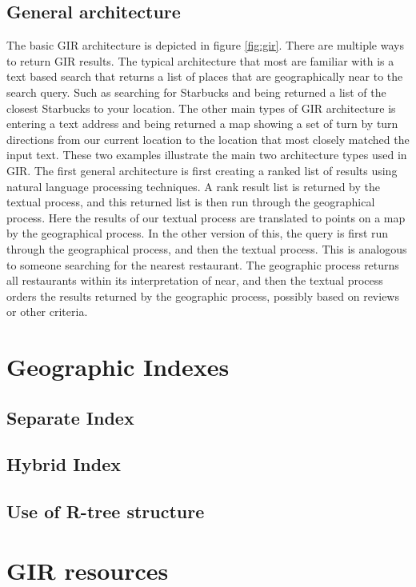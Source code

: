 \documentclass[10pt, conference, compsocconf]{IEEEtran}
\begin{document}
\subsection{General architecture}
The basic GIR architecture is depicted in figure \ref{fig:gir}. There are multiple ways to return GIR results. The typical architecture that most are familiar with is a text based search that returns a list of places that are geographically near to the search query. Such as searching for Starbucks and being returned a list of the closest Starbucks to your location. The other main types of GIR architecture is entering a text address and being returned a map showing a set of turn by turn directions from our current location to the location that most closely matched the input text. These two examples illustrate the main two architecture types used in GIR. The first general architecture is first creating a ranked list of results using natural language processing techniques. A rank result list is returned by the textual process, and this returned list is then run through the geographical process. Here the results of our textual process are translated to points on a map by the geographical process. In the other version of this, the query is first run through the geographical process, and then the textual process. This is analogous to someone searching for the nearest restaurant. The geographic process returns all restaurants within its interpretation of near, and then the textual process orders the results returned by the geographic process, possibly based on reviews or other criteria. 
\section{Geographic Indexes}
\subsection{Separate Index}
\subsection{Hybrid Index}
\subsection{Use of R-tree structure}
\section{GIR resources}
\end{document}
